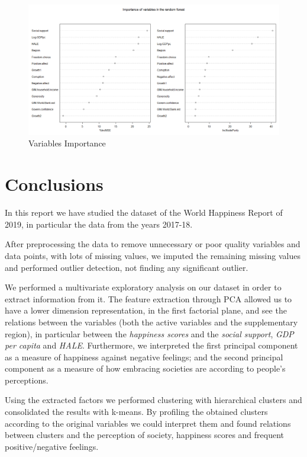 \documentclass[12pt]{extarticle}
\begin{document}
\begin{figure}[H]
  \centering
    \includegraphics[width=1\textwidth]{figures/random-importance.png}
    \caption{Variables Importance\label{fig:random-importance}}
\end{figure}

\newpage
\section{Conclusions}

In this report we have studied the dataset of the World Happiness Report of 2019, in particular the data from the years 2017-18.

After preprocessing the data to remove unnecessary or poor quality variables and data points, with lots of missing values, we imputed the remaining missing values and performed outlier detection, not finding any significant outlier.

We performed a multivariate exploratory analysis on our dataset in order to extract information from it. The feature extraction through PCA allowed us to have a lower dimension representation, in the first factorial plane, and see the relations between the variables (both the active variables and the supplementary region), in particular between the \textit{happiness scores} and the \textit{social support}, \textit{GDP per capita} and \textit{HALE}. Furthermore, we interpreted the first principal component as a measure of happiness against negative feelings; and the second principal component as a measure of how embracing societies are according to people’s perceptions.

Using the extracted factors we performed clustering with hierarchical clusters and consolidated the results with k-means. By profiling the obtained clusters according to the original variables we could interpret them and found relations between clusters and the perception of society, happiness scores and frequent positive/negative feelings.
\end{document}
